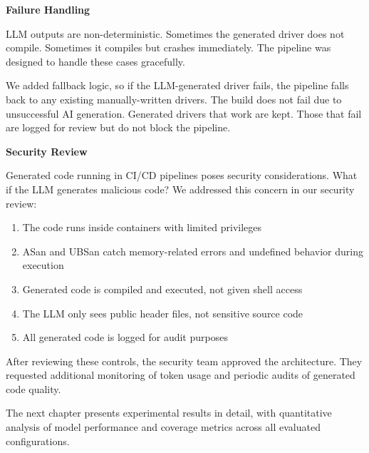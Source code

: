 \textbf{Failure Handling}

LLM outputs are non-deterministic. Sometimes the generated driver does not compile. Sometimes it compiles but crashes immediately. The pipeline was designed to handle these cases gracefully.

We added fallback logic, so if the LLM-generated driver fails, the pipeline falls back to any existing manually-written drivers. The build does not fail due to unsuccessful AI generation. Generated drivers that work are kept. Those that fail are logged for review but do not block the pipeline.

\textbf{Security Review}

Generated code running in CI/CD pipelines poses security considerations. What if the LLM generates malicious code? We addressed this concern in our security review:

\begin{enumerate}
    \item The code runs inside containers with limited privileges
    \item ASan and UBSan catch memory-related errors and undefined behavior during execution
    \item Generated code is compiled and executed, not given shell access
    \item The LLM only sees public header files, not sensitive source code
    \item All generated code is logged for audit purposes
\end{enumerate}

After reviewing these controls, the security team approved the architecture. They requested additional monitoring of token usage and periodic audits of generated code quality.

The next chapter presents experimental results in detail, with quantitative analysis of model performance and coverage metrics across all evaluated configurations.
